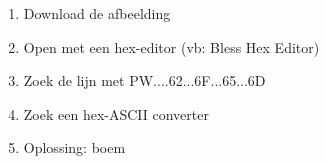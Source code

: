 \begin{enumerate}
  \item Download de afbeelding
  \item Open met een hex-editor (vb: Bless Hex Editor)
  \item Zoek de lijn met PW....62...6F...65...6D
  \item Zoek een hex-ASCII converter
  \item Oplossing: boem
\end{enumerate}